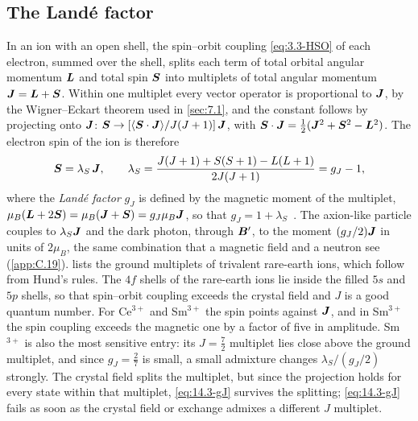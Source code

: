 \subsection{The Landé factor}\label{sec:14.3-lande}

In an ion with an open shell, the spin--orbit coupling \cref{eq:3.3-HSO} of each electron, summed over the shell, splits each term of total orbital angular momentum $\bm{L}$ and total spin $\bm{S}$ into multiplets of total angular momentum $\bm{J} = \bm{L} + \bm{S}$. Within one multiplet every vector operator is proportional to $\bm{J}$, by the Wigner--Eckart theorem used in \cref{sec:7.1}, and the constant follows by projecting onto $\bm{J}$: $\bm{S} \to [\langle\bm{S}\cdot\bm{J}\rangle/J(J+1)]\,\bm{J}$, with $\bm{S}\cdot\bm{J} = \frac12(\bm{J}^2 + \bm{S}^2 - \bm{L}^2)$. The electron spin of the ion is therefore
\begin{equation}
  \bm{S} = \lambda_S\,\bm{J}, \qquad
  \lambda_S = \frac{J(J+1) + S(S+1) - L(L+1)}{2J(J+1)} = g_J - 1 ,
  \label{eq:14.3-gJ}
\end{equation}
where the \emph{Landé factor} $g_J$ is defined by the magnetic moment of the multiplet, $\mu_B(\bm{L} + 2\bm{S}) = \mu_B(\bm{J} + \bm{S}) = g_J\mu_B\bm{J}$, so that $g_J = 1 + \lambda_S$~\cite[Eqs.~(30), (34)]{mitridate2020detectability}. The axion-like particle couples to $\lambda_S\bm{J}$ and the dark photon, through $\bm{B}'$, to the moment $(g_J/2)\bm{J}$ in units of $2\mu_B$, the same combination that a magnetic field and a neutron see (\cref{app:C.19}).  lists the ground multiplets of trivalent rare-earth ions, which follow from Hund's rules. The $4f$ shells of the rare-earth ions lie inside the filled $5s$ and $5p$ shells, so that spin--orbit coupling exceeds the crystal field and $J$ is a good quantum number. For Ce$^{3+}$ and Sm$^{3+}$ the spin points against $\bm{J}$, and in Sm$^{3+}$ the spin coupling exceeds the magnetic one by a factor of five in amplitude. Sm$^{3+}$ is also the most sensitive entry: its $J = \frac72$ multiplet lies close above the ground multiplet, and since $g_J = \frac27$ is small, a small admixture changes $\lambda_S/(g_J/2)$ strongly. The crystal field splits the multiplet, but since the projection holds for every state within that multiplet, \cref{eq:14.3-gJ} survives the splitting; \cref{eq:14.3-gJ} fails as soon as the crystal field or exchange admixes a different $J$ multiplet.

